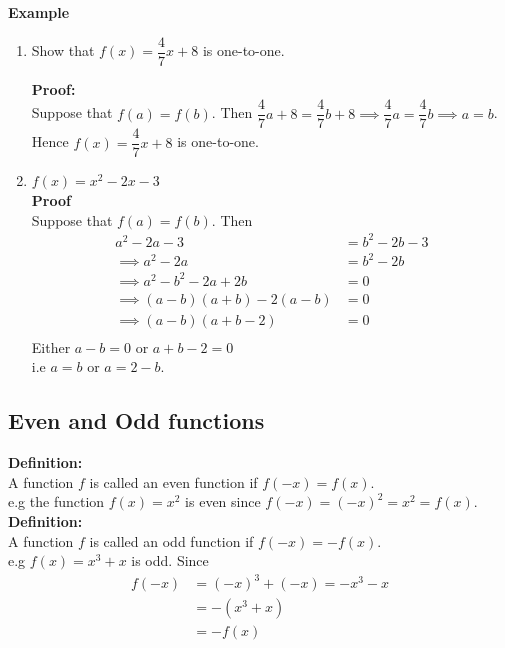 \documentclass[11pt,a4paper]{article}
\begin{document}
\textbf{Example}
\begin{enumerate}
\item Show that $f(x)=\dfrac{4}{7}x+8$ is one-to-one.

\textbf{Proof:}\\
 Suppose that $f(a)=f(b)$. Then $\dfrac{4}{7}a+8=\dfrac{4}{7}b+8\implies \dfrac{4}{7}a=\dfrac{4}{7}b\implies a=b$.\\
 Hence $f(x)=\dfrac{4}{7}x+8$ is one-to-one.\\
 
\item $f(x)=x^2-2x-3$\\

\textbf{Proof}\\
Suppose that $f(a)=f(b)$. Then
\begin{align*}
a^2-2a-3 & = b^2-2b-3\\
\implies a^2-2a & = b^2-2b\\
\implies a^2-b^2-2a+2b & =0\\
\implies (a-b)(a+b)-2(a-b) & = 0\\
\implies (a-b)(a+b-2) &=0\\
\end{align*}
Either $a-b=0$ or $a+b-2=0$\\
i.e $a=b$ or $a=2-b$.\\
\end{enumerate}



\subsection{Even and Odd functions}
\textbf{Definition:}\\
A function $f$ is called an even function if $f(-x)=f(x)$.\\

e.g the function $f(x)=x^2$ is even since $f(-x)=(-x)^2=x^2=f(x)$.\\

\textbf{Definition:}\\
A function $f$ is called an odd function if $f(-x)=-f(x)$.\\

e.g $f(x)=x^3+x$ is odd. Since 
\begin{align*}
f(-x) & = (-x)^3+(-x)=-x^3-x\\
      & = -(x^3+x)\\
      & = -f(x)\\
\end{align*}
\end{document}
